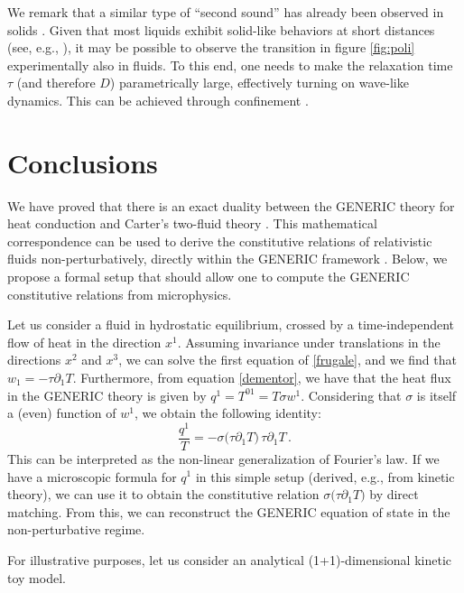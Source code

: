 \documentclass[a4paper, amsfonts, amssymb, amsmath, reprint, showkeys, nofootinbib, twoside, onecolumn, notitlepage]{revtex4-1}
\begin{document}
We remark that a similar type of ``second sound'' has already been observed in solids \cite{Chester1963,SecondSound1964,Enz1974,DingChenBai2022}. Given that most liquids exhibit solid-like behaviors at short distances (see, e.g., \cite{BAGGIOLI20201,Kume2021}), it may be possible to observe the transition in figure \ref{fig:poli} experimentally also in fluids. To this end, one needs to make the relaxation time $\tau$ (and therefore $D$) parametrically large, effectively turning on wave-like dynamics. This can be achieved through confinement \cite{YuBaggioli2023}.


\section{Conclusions}

We have proved that there is an exact duality between the GENERIC theory for heat conduction \cite{OttingerSoloHeat1998} and Carter's two-fluid theory \cite{noto_rel}. This mathematical correspondence can be used to derive the constitutive relations of relativistic fluids non-perturbatively, directly within the GENERIC framework \cite{Grmela1997}. Below, we propose a formal setup that should allow one to compute the GENERIC constitutive relations from microphysics.

Let us consider a fluid in hydrostatic equilibrium, crossed by a time-independent flow of heat in the direction $x^1$. Assuming invariance under translations in the directions $x^2$ and $x^3$, we can solve the first equation of \eqref{frugale}, and we find
that $w_1=-\tau \partial_1 T$. Furthermore, from equation \eqref{dementor}, we have that the heat flux in the GENERIC theory is given by $q^1=T^{01}=T\sigma w^1$. Considering that $\sigma$ is itself a (even) function of $w^1$, we obtain the following identity:
\begin{equation}
    \dfrac{q^1}{T} =- \sigma \big(\tau \partial_1 T\big) \, \tau \partial_1 T  \, .
\end{equation}
This can be interpreted as the non-linear generalization of Fourier's law. If we have a microscopic formula for $q^1$ in this simple setup (derived, e.g., from kinetic theory), we can use it to obtain the constitutive relation $\sigma \big(\tau \partial_1 T\big)$ by direct matching. From this, we can reconstruct the GENERIC equation of state in the non-perturbative regime.

For illustrative purposes, let us consider an analytical (1+1)-dimensional kinetic toy model. 
\end{document}
